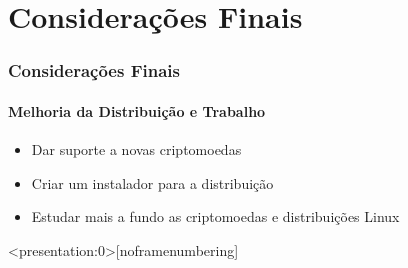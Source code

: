 \documentclass[aspectratio=43]{beamer}
\begin{document}
\section{Considerações Finais}

\begin{frame}
    \frametitle{Considerações Finais}
    \framesubtitle{Melhoria da Distribuição e Trabalho}

    \begin{itemize}
        \item Dar suporte a novas criptomoedas

        \item Criar um instalador para a distribuição

        \item Estudar mais a fundo as criptomoedas e
            distribuições Linux

    \end{itemize}
\end{frame}




\begin{frame}<presentation:0>[noframenumbering]

\end{frame}

\end{document}
